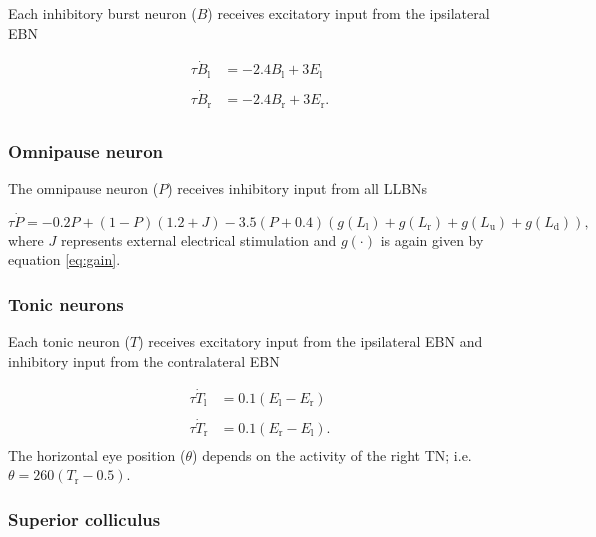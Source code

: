 \documentclass[10pt,a4paper,onecolumn]{article}
\begin{document}
Each inhibitory burst neuron (\(B\)) receives excitatory input from the
ipsilateral EBN

\begin{equation}
\begin{array}{ll}
\tau\dot B_\mathrm{l} &= -2.4B_\mathrm{l}+3E_\mathrm{l} \\\\
\tau\dot B_\mathrm{r} &= -2.4B_\mathrm{r}+3E_\mathrm{r} \textrm{.} \\
\end{array}
\label{eq:ibn}\end{equation}

\subsubsection{Omnipause neuron}\label{omnipause-neuron}

The omnipause neuron (\(P\)) receives inhibitory input from all LLBNs

\begin{equation}
\tau\dot P = -0.2P+(1-P)(1.2+J)-3.5(P+0.4)(g(L_\mathrm{l})+g(L_\mathrm{r})+g(L_\mathrm{u})+g(L_\mathrm{d})) \textrm{,}
\label{eq:opn}\end{equation} where \(J\) represents external electrical
stimulation and \(g(\cdot)\) is again given by equation \ref{eq:gain}.

\subsubsection{Tonic neurons}\label{tonic-neurons}

Each tonic neuron (\(T\)) receives excitatory input from the ipsilateral
EBN and inhibitory input from the contralateral EBN

\begin{equation}
\begin{array}{ll}
\tau\dot T_\mathrm{l} &= 0.1(E_\mathrm{l}-E_\mathrm{r}) \\\\
\tau\dot T_\mathrm{r} &= 0.1(E_\mathrm{r}-E_\mathrm{l}) \textrm{.} \\
\end{array}
\label{eq:tn}\end{equation} The horizontal eye position (\(\theta\))
depends on the activity of the right TN; i.e.
\(\theta = 260(T_\mathrm{r}-0.5)\).

\subsubsection{Superior colliculus}\label{superior-colliculus}
\end{document}
